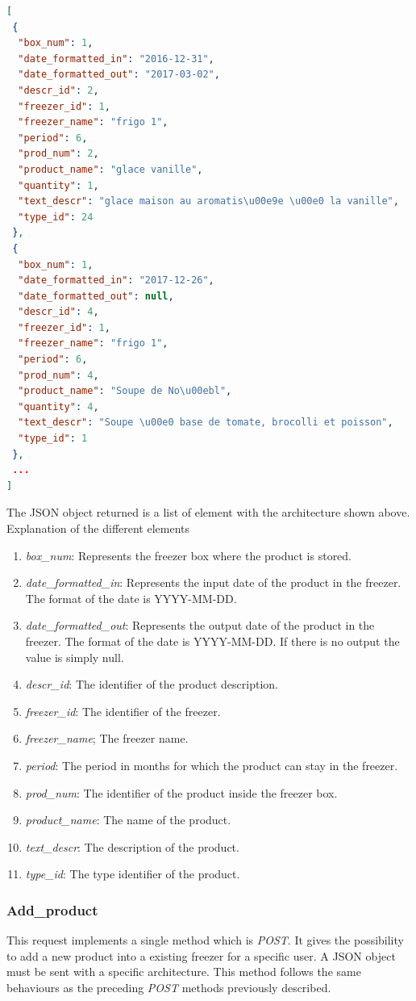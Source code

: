 \begin{lstlisting}[language=json]
[
 {
  "box_num": 1, 
  "date_formatted_in": "2016-12-31", 
  "date_formatted_out": "2017-03-02", 
  "descr_id": 2, 
  "freezer_id": 1, 
  "freezer_name": "frigo 1", 
  "period": 6, 
  "prod_num": 2, 
  "product_name": "glace vanille", 
  "quantity": 1, 
  "text_descr": "glace maison au aromatis\u00e9e \u00e0 la vanille", 
  "type_id": 24
 },
 {
  "box_num": 1, 
  "date_formatted_in": "2017-12-26", 
  "date_formatted_out": null, 
  "descr_id": 4, 
  "freezer_id": 1, 
  "freezer_name": "frigo 1", 
  "period": 6, 
  "prod_num": 4, 
  "product_name": "Soupe de No\u00ebl", 
  "quantity": 4, 
  "text_descr": "Soupe \u00e0 base de tomate, brocolli et poisson", 
  "type_id": 1
 },
 ...
] 
\end{lstlisting}
The JSON object returned is a list of element with the architecture shown above.
Explanation of the different elements
\begin{enumerate}
\item \textit{box\_num}: Represents the freezer box where the product is stored.
\item \textit{date\_formatted\_in}: Represents the input date of the product in the freezer. The format of the date is YYYY-MM-DD.
\item \textit{date\_formatted\_out}: Represents the output date of the product in the freezer. The format of the date is YYYY-MM-DD. If there is no output the value is simply null.
\item \textit{descr\_id}: The identifier of the product description.
\item \textit{freezer\_id}: The identifier of the freezer.
\item \textit{freezer\_name}; The freezer name.
\item \textit{period}: The period in months for which the product can stay in the freezer.
\item \textit{prod\_num}: The identifier of the product inside the freezer box.
\item \textit{product\_name}: The name of the product.
\item \textit{text\_descr}: The description of the product.
\item \textit{type\_id}: The type identifier of the product.
\end{enumerate}

\subsubsection{Add\_product}
This request implements a single method which is \textit{POST}. It gives the possibility to add a new product into a existing freezer for a specific user. A JSON object must be sent with a specific architecture. This method follows the same behaviours as the preceding \textit{POST} methods previously described.\\

